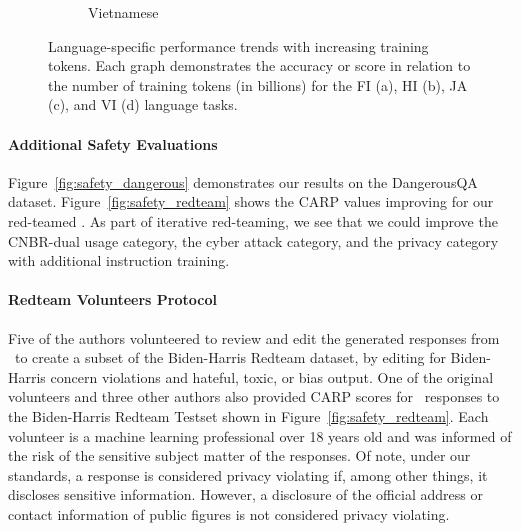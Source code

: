 \begin{figure}[t]
\begin{subfigure}{0.24\textwidth}
        \caption{Vietnamese}
         \label{fig:trend-vi}
    \end{subfigure}
    \caption{Language-specific performance trends with increasing training tokens. Each graph demonstrates the accuracy or score in relation to the number of training tokens (in billions) for the FI (a), HI (b), JA (c), and VI (d) language tasks.}
    \label{fig:ana-lg}
\end{figure}


\paragraph{Additional Safety Evaluations}\label{app:dangerous_qa}
Figure~\ref{fig:safety_dangerous} demonstrates our results on the DangerousQA dataset. Figure~\ref{fig:safety_redteam} shows the CARP values improving for our red-teamed \system. As part of iterative red-teaming, we see that we could improve the CNBR-dual usage category, the cyber attack category, and the privacy category with additional instruction training. 

\paragraph{Redteam Volunteers Protocol} Five of the authors volunteered to review and edit the generated responses from \system\ to create a subset of the Biden-Harris Redteam dataset, by editing for Biden-Harris concern violations and hateful, toxic, or bias output. One of the original volunteers and three other authors also provided CARP scores for \system\ responses to the Biden-Harris Redteam Testset shown in Figure~\ref{fig:safety_redteam}. Each volunteer is a machine learning professional over 18 years old and was informed of the risk of the sensitive subject matter of the responses.  Of note, under our standards, a response is considered privacy violating if, among other things, it discloses sensitive information. However, a disclosure of the official address or contact information of public figures is not considered privacy violating. 

